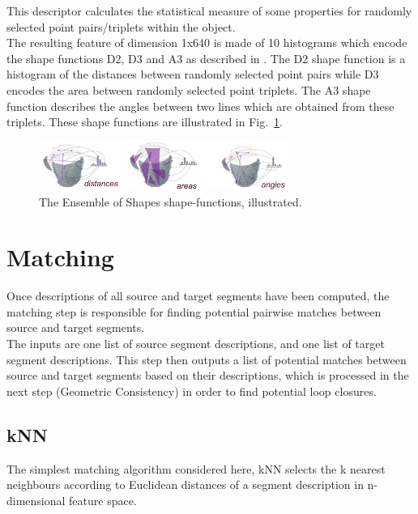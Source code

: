 This descriptor calculates the statistical measure of some properties for randomly selected point pairs/triplets within the object.\\

The resulting feature of dimension 1x640 is made of 10 histograms which encode the shape functions D2, D3 and A3 as described in \citet{wohlkinger2011ensemble}.
%
The D2 shape function is a histogram of the distances between randomly selected point pairs while D3 encodes the area between randomly selected point triplets.
%
The A3 shape function describes the angles between two lines which are obtained from these triplets. These shape functions are illustrated in Fig.~\ref{fig:eos}.

\begin{figure}
  \centering
  \includegraphics[width=3.2in]{images/eos.png}
  \caption{The Ensemble of Shapes shape-functions, illustrated.}
  \label{fig:eos}
\end{figure}

\section{Matching}
\label{sec:matching}

Once descriptions of all source and target segments have been computed, the matching step is responsible for finding potential pairwise matches between source and target segments.\\ 

The inputs are one list of source segment descriptions, and one list of target segment descriptions. This step then outputs a list of potential matches between source and target segments based on their descriptions, which is processed in the next step (Geometric Consistency) in order to find potential loop closures.\\

\subsection{kNN}
\label{subsec:kNN}

The simplest matching algorithm considered here, kNN selects the k nearest neighbours according to Euclidean distances of a segment description in n-dimensional feature space.\\

